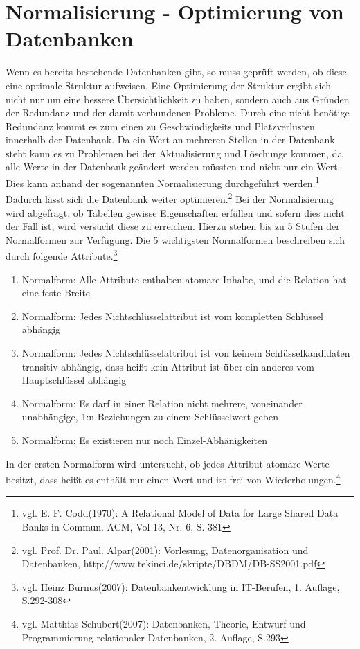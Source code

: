 \section{Normalisierung - Optimierung von Datenbanken}
\label{secNormalisierung}
Wenn es bereits bestehende Datenbanken gibt, so muss geprüft werden, ob diese eine optimale Struktur aufweisen.
Eine Optimierung der Struktur ergibt sich nicht nur um eine bessere Übersichtlichkeit zu haben, sondern auch aus Gründen der Redundanz und der damit verbundenen Probleme.
Durch eine nicht benötige Redundanz kommt es zum einen zu Geschwindigkeits und Platzverlusten innerhalb der Datenbank.
Da ein Wert an mehreren Stellen in der Datenbank steht kann es zu Problemen bei der Aktualisierung und Löschunge kommen, da alle Werte in der Datenbank geändert werden müssten und nicht nur ein Wert.
Dies kann anhand der sogenannten Normalisierung durchgeführt werden.\footnote{vgl. E. F. Codd(1970): A Relational Model of Data for Large Shared Data Banks in Commun. ACM, Vol 13, Nr. 6, S. 381} Dadurch lässt sich die Datenbank weiter optimieren.\footnote{vgl. Prof. Dr. Paul. Alpar(2001): Vorlesung, Datenorganisation und Datenbanken,  http://www.tekinci.de/skripte/DBDM/DB-SS2001.pdf}
Bei der Normalisierung wird abgefragt, ob Tabellen gewisse Eigenschaften erfüllen und sofern dies nicht der Fall ist, wird versucht diese zu erreichen.
Hierzu stehen bis zu 5 Stufen der Normalformen zur Verfügung.
Die 5 wichtigsten Normalformen beschreiben sich durch folgende Attribute.\footnote{vgl. Heinz Burnus(2007): Datenbankentwicklung in IT-Berufen, 1. Auflage, S.292-308}

\begin{enumerate}
\item Normalform: Alle Attribute enthalten atomare Inhalte, und die Relation hat eine feste Breite
\item Normalform: Jedes Nichtschlüsselattribut ist vom kompletten Schlüssel abhängig
\item Normalform: Jedes Nichtschlüsselattribut ist von keinem Schlüsselkandidaten transitiv abhängig, dass heißt kein Attribut ist über ein anderes vom Hauptschlüssel abhängig
\item Normalform: Es darf in einer Relation nicht mehrere, voneinander unabhängige, 1:n-Beziehungen zu einem Schlüsselwert geben
\item Normalform: Es existieren nur noch Einzel-Abhänigkeiten
\end{enumerate}


In der ersten Normalform wird untersucht, ob jedes Attribut atomare Werte besitzt, dass heißt es enthält nur einen Wert und ist frei von Wiederholungen.\footnote{vgl. Matthias Schubert(2007): Datenbanken, Theorie, Entwurf und Programmierung relationaler Datenbanken, 2. Auflage, S.293}


